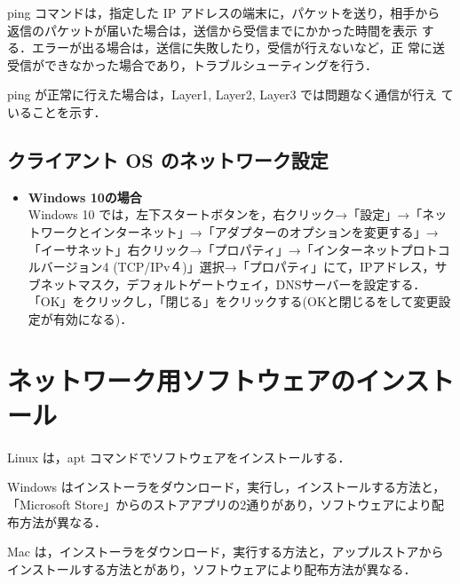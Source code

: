 ping コマンドは，指定した IP アドレスの端末に，パケットを送り，相手から
     返信のパケットが届いた場合は，送信から受信までにかかった時間を表示
     する．エラーが出る場合は，送信に失敗したり，受信が行えないなど，正
     常に送受信ができなかった場合であり，トラブルシューティングを行う．

ping が正常に行えた場合は，Layer1, Layer2, Layer3 では問題なく通信が行え
     ていることを示す．


\subsection*{クライアント OS のネットワーク設定}

\begin{itemize}
\item{\bf Windows 10の場合}\\
Windows 10 では，左下スタートボタンを，右クリック→「設定」→「ネットワークとインターネット」→「アダプターのオプションを変更する」→「イーサネット」右クリック→「プロパティ」→「インターネットプロトコルバージョン4 (TCP/IPv４)」選択→「プロパティ」にて，IPアドレス，サブネットマスク，デフォルトゲートウェイ，DNSサーバーを設定する．\\
 「OK」をクリックし，「閉じる」をクリックする(OKと閉じるをして変更設定が有効になる)．
\end{itemize}

\section{ネットワーク用ソフトウェアのインストール}

Linux は，apt コマンドでソフトウェアをインストールする．



Windows はインストーラをダウンロード，実行し，インストールする方法と，「Microsoft Store」からのストアアプリの2通りがあり，ソフトウェアにより配布方法が異なる．

Mac は，インストーラをダウンロード，実行する方法と，アップルストアからインストールする方法とがあり，ソフトウェアにより配布方法が異なる．


